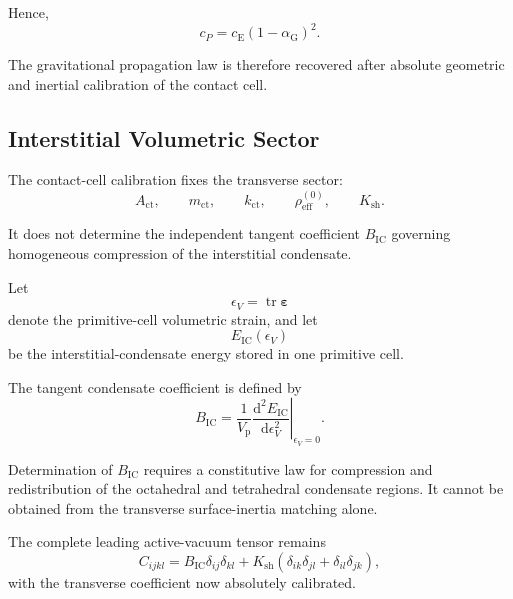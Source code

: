 Hence,
\begin{equation}
    \boxed{ c_P = c_{\mathrm{E}} \left( 1-\alpha_{\mathrm{G}} \right)^2 }.
\end{equation}

The gravitational propagation law is therefore recovered after absolute geometric and inertial calibration of the contact cell.

\subsection{Interstitial Volumetric Sector}

The contact-cell calibration fixes the transverse sector:
\begin{equation}
    A_{\mathrm{ct}}, \qquad m_{\mathrm{ct}}, \qquad k_{\mathrm{ct}}, \qquad \rho_{\mathrm{eff}}^{(0)}, \qquad K_{\mathrm{sh}}.
\end{equation}

It does not determine the independent tangent coefficient $B_{\mathrm{IC}}$ governing homogeneous compression of the interstitial condensate.

Let
\begin{equation}
    \epsilon_V = \operatorname{tr}\boldsymbol{\varepsilon}
\end{equation}
denote the primitive-cell volumetric strain, and let
\begin{equation}
    E_{\mathrm{IC}}(\epsilon_V)
\end{equation}
be the interstitial-condensate energy stored in one primitive cell.

The tangent condensate coefficient is defined by
\begin{equation}
    \boxed{ B_{\mathrm{IC}} = \frac{1}{V_{\mathrm{p}}} \left. \frac{\mathrm{d}^2E_{\mathrm{IC}}}{\mathrm{d}\epsilon_V^2} \right|_{\epsilon_V=0} }.
\end{equation}

Determination of $B_{\mathrm{IC}}$ requires a constitutive law for compression and redistribution of the octahedral and tetrahedral condensate regions. It cannot be obtained from the transverse surface-inertia matching alone.

The complete leading active-vacuum tensor remains
\begin{equation}
    C_{ijkl} = B_{\mathrm{IC}} \delta_{ij}\delta_{kl} + K_{\mathrm{sh}} \left( \delta_{ik}\delta_{jl} + \delta_{il}\delta_{jk} \right),
\end{equation}
with the transverse coefficient now absolutely calibrated.

